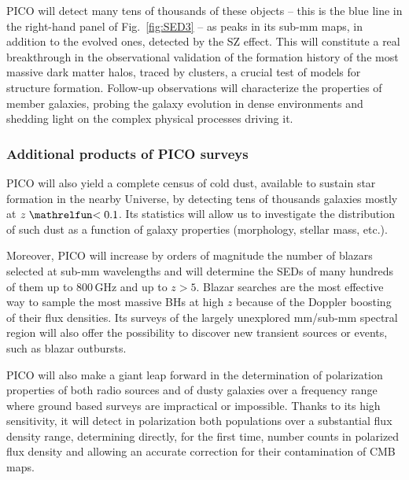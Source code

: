 \documentclass[PICOReport.tex]{subfiles}
\begin{document}
PICO will detect many tens of thousands of these objects -- this is the blue line in the right-hand panel of Fig.~\ref{fig:SED3} -- as peaks in its sub-mm maps, in addition to the evolved ones, detected by the SZ effect. This will constitute a real breakthrough in the observational validation of the formation history of the most massive dark matter halos, traced by clusters, a crucial test of models for structure formation. Follow-up observations will characterize the properties of member galaxies, probing the galaxy evolution in dense environments and shedding light on the complex physical processes driving it.

\subsubsection{Additional products of PICO surveys}

PICO will also yield a complete census of cold dust, available to sustain star formation in the nearby Universe, by detecting tens of thousands galaxies mostly at $z\simlt 0.1$. Its statistics will allow us to investigate the distribution of such dust as a function of galaxy properties (morphology, stellar mass, etc.).

Moreover, PICO will increase by orders of magnitude the number of blazars selected at sub-mm wavelengths and will determine the SEDs of many hundreds of them up to 800\,GHz and up to $z> 5$. Blazar searches are the most effective way to sample the most massive BHs at high $z$ because of the Doppler boosting of their flux densities. Its surveys of the largely unexplored mm/sub-mm spectral region will also offer the possibility to discover new transient sources \cite{Metzger2015} or events, such as blazar outbursts.

PICO will also make a giant leap forward in the determination of
polarization properties of both radio sources and of dusty galaxies over a frequency range where ground based surveys are impractical or impossible. Thanks to its high sensitivity, it will detect in polarization both populations over a substantial flux density range, determining directly, for the first time, number counts in polarized flux density and allowing an accurate correction for their contamination of CMB maps.
\end{document}
